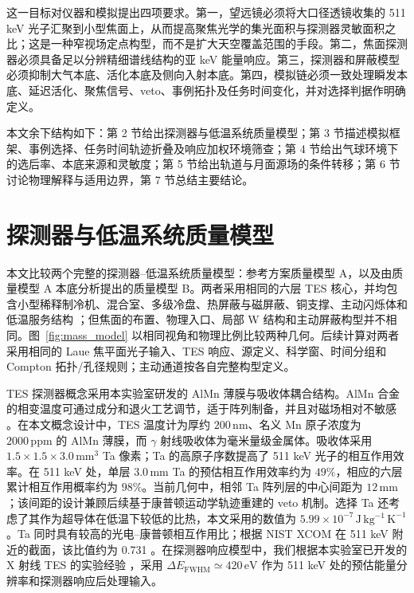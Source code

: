 \documentclass[11pt]{article}
\begin{document}
\begingroup
{}
这一目标对仪器和模拟提出四项要求。第一，望远镜必须将大口径透镜收集的 511 keV 光子汇聚到小型焦面上，从而提高聚焦光学的集光面积与探测器灵敏面积之比；这是一种窄视场定点构型，而不是扩大天空覆盖范围的手段。第二，焦面探测器必须具备足以分辨精细谱线结构的亚 keV 能量响应。第三，探测器和屏蔽模型必须抑制大气本底、活化本底及侧向入射本底。第四，模拟链必须一致处理瞬发本底、延迟活化、聚焦信号、veto、事例拓扑及任务时间变化，并对选择判据作明确定义。
\par
\endgroup

本文余下结构如下：第 2 节给出探测器与低温系统质量模型；第 3 节描述模拟框架、事例选择、任务时间轨迹折叠及响应加权环境筛查；第 4 节给出气球环境下的选后率、本底来源和灵敏度；第 5 节给出轨道与月面源场的条件转移；第 6 节讨论物理解释与适用边界，第 7 节总结主要结论。

\endgroup

\section{探测器与低温系统质量模型}
\label{sec:geometry}

本文比较两个完整的探测器--低温系统质量模型：参考方案质量模型 A，以及由质量模型 A 本底分析提出的质量模型 B。两者采用相同的六层 TES 核心，并均包含小型稀释制冷机、混合室、多级冷盘、热屏蔽与磁屏蔽、铜支撑、主动闪烁体和低温服务结构 \cite{Shirazi2023,Gottardi2021TESReview}；但焦面的布置、物理入口、局部 W 结构和主动屏蔽构型并不相同。图~\ref{fig:mass_model} 以相同视角和物理比例比较两种几何。后续计算对两者采用相同的 Laue 焦平面光子输入、TES 响应、源定义、科学窗、时间分组和 Compton 拓扑/孔径规则；主动通道按各自完整构型定义。

TES 探测器概念采用本实验室研发的 AlMn 薄膜与吸收体耦合结构。AlMn 合金的相变温度可通过成分和退火工艺调节，适于阵列制备，并且对磁场相对不敏感 \cite{Xie2026AlMn,Vavagiakis2017AlMnMagnetic}。在本文概念设计中，TES 温度计为厚约 $200\,\mathrm{nm}$、名义 Mn 原子浓度为 $2000\,\mathrm{ppm}$ 的 AlMn 薄膜，而 $\gamma$ 射线吸收体为毫米量级金属体。吸收体采用 $1.5\times1.5\times3.0\,\mathrm{mm^3}$ Ta 像素；Ta 的高原子序数提高了 511 keV 光子的相互作用效率。在 511 keV 处，单层 $3.0\,\mathrm{mm}$ Ta 的预估相互作用效率约为 $49\%$，相应的六层累计相互作用概率约为 $98\%$。当前几何中，相邻 Ta 阵列层的中心间距为 $12\,\mathrm{mm}$；该间距的设计兼顾后续基于康普顿运动学轨迹重建的 veto 机制。选择 Ta 还考虑了其作为超导体在低温下较低的比热，本文采用的数值为 $5.99\times10^{-7}\,\mathrm{J\,kg^{-1}\,K^{-1}}$。Ta 同时具有较高的光电--康普顿相互作用比；根据 NIST XCOM 在 511 keV 附近的截面，该比值约为 0.731 \cite{NISTXCOM}。在探测器响应模型中，我们根据本实验室已开发的 X 射线 TES 的实验经验 \cite{Xie2026AlMn}，采用 $\Delta E_{\mathrm{FWHM}}\simeq420\,\mathrm{eV}$ 作为 511 keV 处的预估能量分辨率和探测器响应后处理输入。
\end{document}
